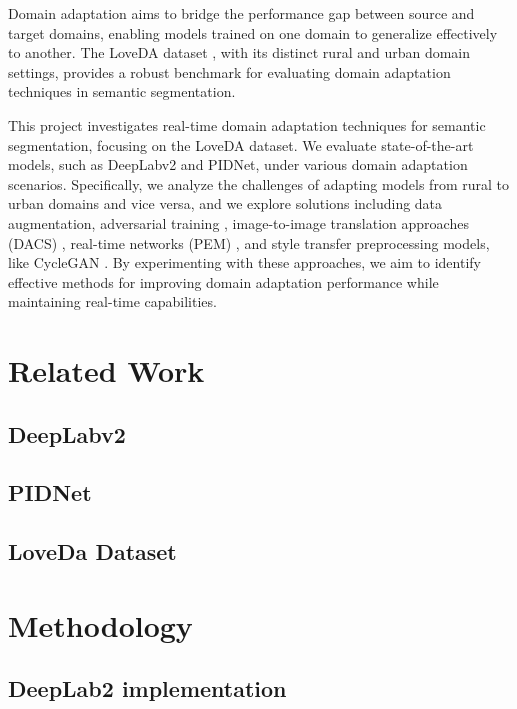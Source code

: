 \documentclass[10pt,twocolumn,letterpaper]{article}
\begin{document}
Domain adaptation aims to bridge the performance gap between source and target domains, enabling models trained on one domain to generalize effectively to another. The LoveDA dataset \cite{wang2021loveda}, with its distinct rural and urban domain settings, provides a robust benchmark for evaluating domain adaptation techniques in semantic segmentation. 

This project investigates real-time domain adaptation techniques for semantic segmentation, focusing on the LoveDA dataset. We evaluate state-of-the-art models, such as DeepLabv2 and PIDNet, under various domain adaptation scenarios. Specifically, we analyze the challenges of adapting models from rural to urban domains and vice versa, and we explore solutions including data augmentation, adversarial training \cite{tsai2018advlearning}, image-to-image translation approaches (DACS) \cite{tranheden2021dacs}, real-time networks (PEM) \cite{cavagnero2024pem}, and style transfer preprocessing models, like CycleGAN \cite{zhu2020cyclegan}. By experimenting with these approaches, we aim to identify effective methods for improving domain adaptation performance while maintaining real-time capabilities.

\section{Related Work}

\subsection{DeepLabv2}

\subsection{PIDNet}

\subsection{LoveDa Dataset}

\section{Methodology}

\subsection{DeepLab2 implementation}
\end{document}
